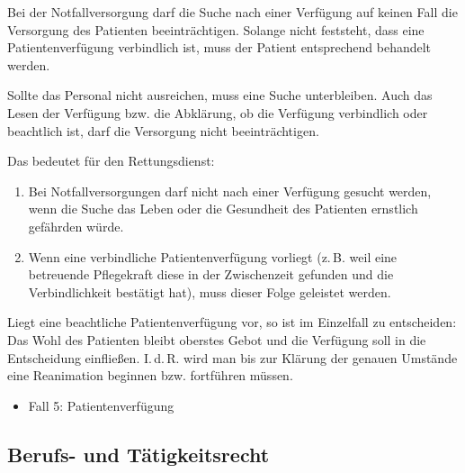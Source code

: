 {
Bei der Notfallversorgung darf die Suche nach einer
Verfügung auf keinen Fall die Versorgung des Patienten
beeinträchtigen. Solange nicht  feststeht,
dass eine Patientenverfügung verbindlich ist, muss der
Patient entsprechend behandelt werden.

Sollte das Personal nicht ausreichen, muss eine Suche
unterbleiben. Auch das Lesen der
Verfügung bzw. die Abklärung, ob die Verfügung verbindlich
oder beachtlich ist, darf die Versorgung nicht
beeinträchtigen.

Das bedeutet für den Rettungsdienst: 
\begin{enumerate}
  \item Bei Notfallversorgungen darf nicht nach einer
  Verfügung gesucht werden, wenn die Suche das Leben oder
  die Gesundheit des Patienten ernstlich gefährden würde.
  \item {} Wenn  eine verbindliche
  Patientenverfügung vorliegt (z.\,B. weil eine betreuende
  Pflegekraft diese in der Zwischenzeit gefunden und die
  Verbindlichkeit bestätigt hat), muss dieser Folge
  geleistet werden.
\end{enumerate}

Liegt eine beachtliche Patientenverfügung vor, so ist im
Einzelfall zu entscheiden: Das Wohl des Patienten bleibt
oberstes Gebot und die Verfügung soll in die
Entscheidung einfließen. I.\,d.\,R. wird man bis zur Klärung
der genauen Umstände eine Reanimation beginnen bzw.
fortführen müssen.

}
{}
{}
{}
{}



{
\begin{itemize}
  \item Fall 5: Patientenverfügung
  \dotfill{}
\end{itemize}
}
{}
{}
{}
{}

\subsection{Berufs- und Tätigkeitsrecht}

